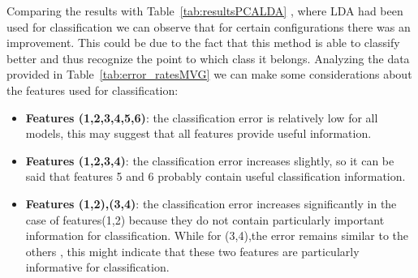 \documentclass{article}
\begin{document}
Comparing the results with Table~\ref{tab:resultsPCALDA} , where LDA had been used for classification we can observe that for certain configurations there was an improvement. This could be due to the fact that this method is able to classify better and thus recognize the point to which class it belongs.
Analyzing the data provided in Table~\ref{tab:error_ratesMVG} we can make some considerations about the features used for classification:
\begin{itemize}
    \item \textbf{Features (1,2,3,4,5,6)}: the classification error is relatively low for all models, this may suggest that all features provide useful information.
    \item \textbf{Features (1,2,3,4)}: the classification error increases slightly, so it can be said that features 5 and 6 probably contain useful classification information.
    \item \textbf{Features (1,2),(3,4)}: the classification error increases significantly in the case of features(1,2) because they do not contain particularly important information for classification. While for (3,4),the error remains similar to the others , this might indicate that these two features are particularly informative for classification.  
\end{itemize}
\end{document}
